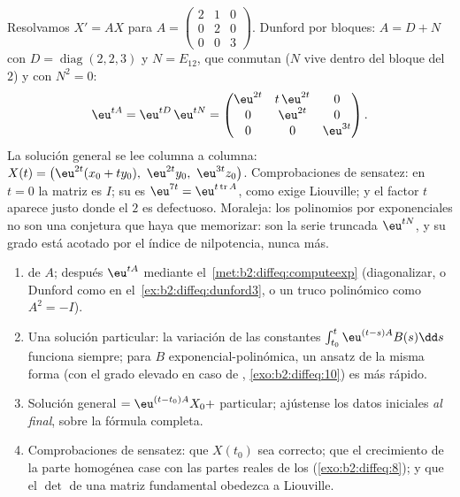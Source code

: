 \begin{example}\label{ex:b2:diffeq:dunford3}
Resolvamos $X' = AX$ para $A = \begin{pmatrix} 2 & 1 & 0\\ 0 & 2 &
0\\ 0 & 0 & 3\end{pmatrix}$. Dunford por bloques: $A = D + N$ con $D
= \operatorname{diag}(2, 2, 3)$ y $N = E_{12}$, que conmutan ($N$
vive dentro del bloque del  $2$) y con $N^2 = 0$:
\[
\eu^{tA} = \eu^{tD}\,\eu^{tN}
= \begin{pmatrix}
\eu^{2t} & t\,\eu^{2t} & 0\\
0 & \eu^{2t} & 0\\
0 & 0 & \eu^{3t}
\end{pmatrix} .
\]
La solución general se lee columna a columna: $X(t) =
\bigl(\eu^{2t}(x_0 + ty_0),\ \eu^{2t}y_0,\ \eu^{3t}z_0\bigr)$.
Comprobaciones de sensatez: en $t = 0$ la matriz es $I$; su
 es $\eu^{7t} = \eu^{t\operatorname{tr}A}$, como exige
Liouville; y el factor $t$ aparece justo donde el  $2$ es
defectuoso. Moraleja: los polinomios por exponenciales no son una
conjetura que haya que memorizar: son la serie truncada $\eu^{tN}$, y
su grado está acotado por el índice de nilpotencia, nunca más.
\end{example}

\begin{method}[Resolver $X' = AX + B(t)$, de principio a fin]\label{met:b2:diffeq:solvelinear}
\begin{enumerate}
  \item {} de $A$; después $\eu^{tA}$ mediante el~\cref{met:b2:diffeq:computeexp} (diagonalizar, o Dunford como
        en el~\cref{ex:b2:diffeq:dunford3}, o un truco polinómico como
        $A^2 = -I$).
  \item Una solución particular: la variación de las constantes
        $\int_{t_0}^t\eu^{(t-s)A}B(s)\dd s$ funciona siempre; para
        $B$ exponencial-polinómica, un ansatz de la misma forma (con
        el grado elevado en caso de ,
        \cref{exo:b2:diffeq:10}) es más rápido.
  \item Solución general $= \eu^{(t-t_0)A}X_0 +$ particular; ajústense
        los datos iniciales \emph{al final}, sobre la fórmula
        completa.
  \item Comprobaciones de sensatez: que $X(t_0)$ sea correcto; que el
        crecimiento de la parte homogénea case con las partes reales
        de los  (\cref{exo:b2:diffeq:8}); y que el
        $\det$ de una matriz fundamental obedezca a Liouville.
\end{enumerate}
\end{method}

